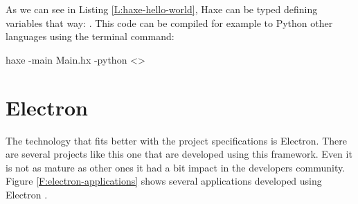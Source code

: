 \begin{codefigure}
\end{codefigure}

As we can see in Listing \ref{L:haxe-hello-world}, Haxe can be typed defining 
variables that way: . This code can be compiled
for example to Python other languages using the terminal command:

\begin{bashcode}
	haxe -main Main.hx -python \textless{}\textgreater
\end{bashcode}

\section{Electron}

The technology that fits better with the project specifications is Electron. 
There are several projects like this one that are developed using this 
framework. Even it is not as mature as other ones it had a bit impact in the
developers community. Figure \ref{F:electron-applications} shows several
applications developed using Electron \cite{electron-web}.

